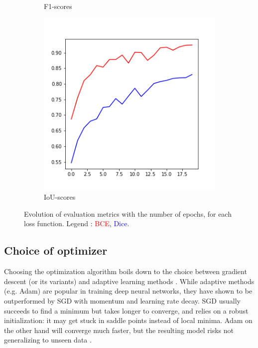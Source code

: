 \documentclass[10pt,conference,compsocconf]{IEEEtran}
\begin{document}
\begin{figure}[ht]
\begin{subfigure}{0.31\linewidth}
        \caption{F1-scores}
    \end{subfigure}
    \begin{subfigure}{0.31\linewidth}
        \includegraphics[width=\linewidth]{doc/images/IoU_scores.png}
        \caption{IoU-scores}
    \end{subfigure}    
    \caption{Evolution of evaluation metrics with the number of epochs, for each loss function. Legend : \textcolor{red}{BCE}, \textcolor{blue}{Dice}.}
    \label{fig:loss_metrics}
\end{figure}

\subsection{Choice of optimizer}

Choosing the optimization algorithm boils down to the choice between gradient descent (or its variants) and adaptive learning methods \cite{optimization_algorithms}. While adaptive methods (e.g. Adam) are popular in training deep neural networks, they have shown to be outperformed by SGD \cite{wilson2018marginal} with momentum and learning rate decay. SGD usually succeeds to find a minimum but takes longer to converge, and relies on a robust initialization: it may get stuck in saddle points instead of local minima. Adam on the other hand will converge much faster, but the resulting model risks not generalizing to unseen data \cite{wilson2018marginal}. \\
\end{document}
